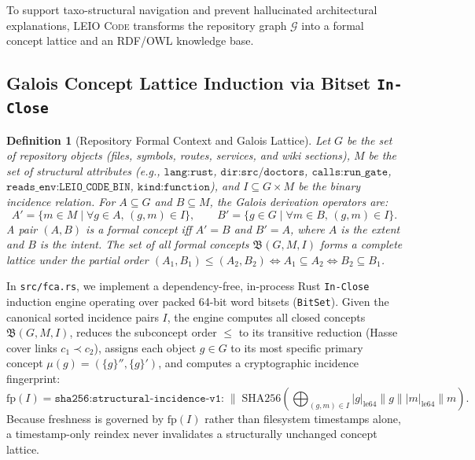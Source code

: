 \documentclass[11pt]{article}
\newtheorem{definition}{Definition}
\begin{document}
To support taxo-structural navigation and prevent hallucinated architectural explanations, \textsc{LEIO Code} transforms the repository graph $\mathcal{G}$ into a formal concept lattice and an RDF/OWL knowledge base.

\subsection{Galois Concept Lattice Induction via Bitset \texttt{In-Close}}

\begin{definition}[Repository Formal Context and Galois Lattice]
Let $G$ be the set of repository objects (files, symbols, routes, services, and wiki sections), $M$ be the set of structural attributes (e.g., $\texttt{lang:rust}$, $\texttt{dir:src/doctors}$, $\texttt{calls:run\_gate}$, $\texttt{reads\_env:LEIO\_CODE\_BIN}$, $\texttt{kind:function}$), and $I \subseteq G \times M$ be the binary incidence relation. For $A \subseteq G$ and $B \subseteq M$, the Galois derivation operators are:
\begin{equation}
A' = \{m \in M \mid \forall g \in A,\, (g, m) \in I\}, \qquad B' = \{g \in G \mid \forall m \in B,\, (g, m) \in I\}.
\end{equation}
A pair $(A, B)$ is a \emph{formal concept} iff $A' = B$ and $B' = A$, where $A$ is the \emph{extent} and $B$ is the \emph{intent}. The set of all formal concepts $\mathfrak{B}(G, M, I)$ forms a complete lattice under the partial order $(A_1, B_1) \le (A_2, B_2) \iff A_1 \subseteq A_2 \iff B_2 \subseteq B_1$.
\end{definition}

In \texttt{src/fca.rs}, we implement a dependency-free, in-process Rust \texttt{In-Close} induction engine operating over packed 64-bit word bitsets (\texttt{BitSet}). Given the canonical sorted incidence pairs $I$, the engine computes all closed concepts $\mathfrak{B}(G, M, I)$, reduces the subconcept order $\le$ to its transitive reduction (Hasse cover links $c_1 \prec c_2$), assigns each object $g \in G$ to its most specific primary concept $\mu(g) = ( \{g\}'', \{g\}' )$, and computes a cryptographic incidence fingerprint:
\begin{equation}
\text{fp}(I) = \texttt{sha256:structural-incidence-v1:} \;\|\; \text{SHA256}\!\left(\bigoplus_{(g, m) \in I} |g|_{\text{le64}} \| g \| |m|_{\text{le64}} \| m\right).
\end{equation}
Because freshness is governed by $\text{fp}(I)$ rather than filesystem timestamps alone, a timestamp-only reindex never invalidates a structurally unchanged concept lattice.
\end{document}
